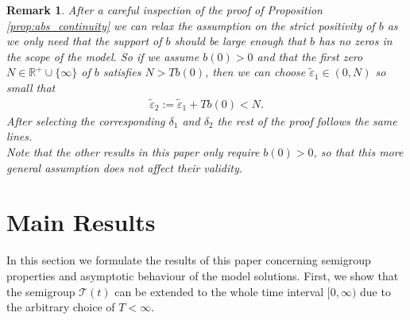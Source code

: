 \documentclass[12pt,a4paper]{amsart}
\newtheorem{remark}[theorem]{Remark}
\newcommand{\R}{\mathbb{R}}
\begin{document}
\begin{remark}
After a careful inspection of the proof of Proposition \ref{prop:abs_continuity} we can relax the assumption on the strict positivity of $b$ as we only need that the support of $b$ should be large enough that $b$ has no zeros in the scope of the model. So if we assume $b(0)>0$ and that the first zero $N\in \R^+\cup\{\infty\}$ of $b$ satisfies $N>Tb(0)$, then we can choose  $\tilde\varepsilon_1\in (0,N)$ so small that 
    \begin{align*}
    \tilde\varepsilon_2:=\tilde\varepsilon_1+Tb(0)<N.
    \end{align*}
After selecting the corresponding $\delta_1$ and $\delta_2$ the rest of the proof follows the same lines. \\
Note that the other results in this paper only require $b(0)>0$, so that this more general assumption does not affect their validity. 
\end{remark}





 
\section{Main Results}
\label{section:main_result}
\noindent
In this section we formulate the results of this paper concerning  semigroup properties and  asymptotic behaviour of the model solutions.
\noindent First, we show that the semigroup $\mathcal{T}(t)$ can be extended to the whole time interval $[0,\infty)$ due to the arbitrary choice of $T<\infty$.
\end{document}
